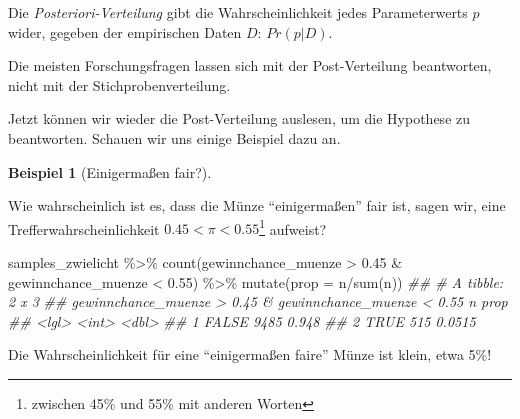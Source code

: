 \documentclass[
  a4paper,
  DIV=11]{scrreprt}
\newenvironment{Shaded}{\begin{snugshade}}{\end{snugshade}}
\newcommand{\AttributeTok}[1]{\textcolor[rgb]{0.40,0.45,0.13}{#1}}
\newcommand{\DocumentationTok}[1]{\textcolor[rgb]{0.37,0.37,0.37}{\textit{#1}}}
\newcommand{\FloatTok}[1]{\textcolor[rgb]{0.68,0.00,0.00}{#1}}
\newcommand{\FunctionTok}[1]{\textcolor[rgb]{0.28,0.35,0.67}{#1}}
\newcommand{\NormalTok}[1]{\textcolor[rgb]{0.00,0.23,0.31}{#1}}
\newcommand{\SpecialCharTok}[1]{\textcolor[rgb]{0.37,0.37,0.37}{#1}}
\theoremstyle{definition}
\newtheorem{example}{Beispiel}[chapter]
\theoremstyle{remark}
\begin{document}
Die \emph{Posteriori-Verteilung} gibt die Wahrscheinlichkeit jedes
Parameterwerts \(p\) wider, gegeben der empirischen Daten \(D\):
\(Pr(p|D)\).

Die meisten Forschungsfragen lassen sich mit der Post-Verteilung
beantworten, nicht mit der Stichprobenverteilung.

Jetzt können wir wieder die Post-Verteilung auslesen, um die Hypothese
zu beantworten. Schauen wir uns einige Beispiel dazu an.

\leavevmode{}%
\begin{example}[Einigermaßen fair?]\label{exm-zwielicht1}

Wie wahrscheinlich ist es, dass die Münze ``einigermaßen'' fair ist,
sagen wir, eine Trefferwahrscheinlichkeit
\(0.45 < \pi < 0.55\)\footnote{zwischen 45\% und 55\% mit anderen Worten}
aufweist?

\begin{Shaded}
\begin{Highlighting}[]
\NormalTok{samples\_zwielicht }\SpecialCharTok{\%\textgreater{}\%} 
  \FunctionTok{count}\NormalTok{(gewinnchance\_muenze }\SpecialCharTok{\textgreater{}} \FloatTok{0.45} \SpecialCharTok{\&}\NormalTok{ gewinnchance\_muenze }\SpecialCharTok{\textless{}} \FloatTok{0.55}\NormalTok{) }\SpecialCharTok{\%\textgreater{}\%} 
  \FunctionTok{mutate}\NormalTok{(}\AttributeTok{prop =}\NormalTok{ n}\SpecialCharTok{/}\FunctionTok{sum}\NormalTok{(n))}
\DocumentationTok{\#\# \# A tibble: 2 x 3}
\DocumentationTok{\#\#   \textasciigrave{}gewinnchance\_muenze \textgreater{} 0.45 \& gewinnchance\_muenze \textless{} 0.55\textasciigrave{}     n   prop}
\DocumentationTok{\#\#   \textless{}lgl\textgreater{}                                                     \textless{}int\textgreater{}  \textless{}dbl\textgreater{}}
\DocumentationTok{\#\# 1 FALSE                                                      9485 0.948 }
\DocumentationTok{\#\# 2 TRUE                                                        515 0.0515}
\end{Highlighting}
\end{Shaded}

Die Wahrscheinlichkeit für eine ``einigermaßen faire'' Münze ist klein,
etwa 5\%!

\end{example}
\end{document}
